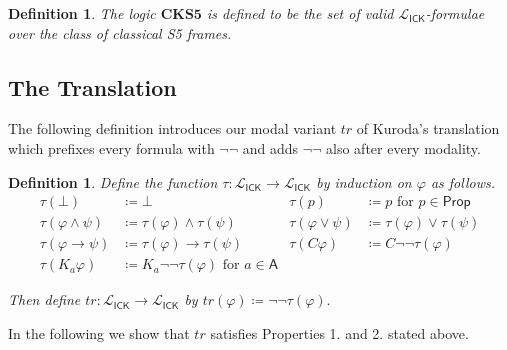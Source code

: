 \documentclass{myifcolog}
\newcommand\C {C}
\newcommand{\K}{K}
\newcommand\Prop {\mathsf{Prop}}
\newcommand\A{\mathsf{A}}
\newcommand{\agi}{a}
\newcommand{\ICK}{\mathsf{ICK}}
\newcommand{\LICK}{\mathcal{L}_{\ICK}}
\newtheorem{definition}[theorem]{Definition}
\numberwithin{theorem}{section}
\begin{document}
\begin{definition}
    The logic $\mathbf{CKS5}$ is defined to be the set of valid $\LICK$-formulae over the class of classical S5 frames.
\end{definition}

\subsection{The Translation}
    
The following definition introduces our modal variant $tr$ of Kuroda's translation which prefixes every formula with $\neg\neg$ and adds $\neg\neg$ also after every modality.

\begin{definition}
    Define the function $\tau: \mathcal{L}_{\ICK} \longrightarrow \mathcal{L}_{\ICK}$ by induction on $\varphi$ as follows.
    \begin{align*}
        \tau(\bot) & \coloneqq \bot  & \tau(p) & \coloneqq p \text{ for } p \in \Prop\\
        \tau(\varphi \wedge \psi) & \coloneqq \tau (\varphi) \wedge \tau(\psi) & \tau(\varphi \vee \psi) & \coloneqq \tau (\varphi) \vee \tau(\psi)\\
        \tau(\varphi \rightarrow \psi) & \coloneqq \tau (\varphi) \rightarrow \tau(\psi) & \tau(\C \varphi) & \coloneqq \C \neg \neg \tau(\varphi) \\
        \tau(\K_\agi \varphi) & \coloneqq \K_\agi \neg \neg \tau(\varphi) \text{ for } \agi \in \A 
    \end{align*}

Then define $tr: \mathcal{L}_{\ICK} \longrightarrow \mathcal{L}_{\ICK}$ by $tr(\varphi) \coloneqq  \neg \neg \tau(\varphi).$
\end{definition}

In the following we show that $tr$ satisfies Properties 1. and 2. stated above.
\end{document}
